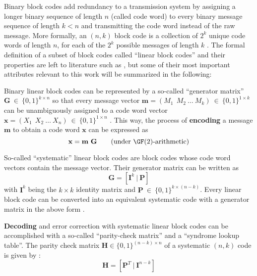 Binary block codes add redundancy to a transmission system by assigning a longer binary sequence of length $n$ (called code word) to every binary message sequence of length $k < n$ and transmitting the code word instead of the raw message.
More formally, an $(n, k)$ block code is a collection of $2^k$ unique code words of length $n$, for each of the $2^k$ possible messages of length $k$ \cite[Section 13.2]{commsys}.
The formal definition of a subset of block codes called ``linear block codes'' and their properties are left to literature such as \cite[Section 13.2]{carlson_commsys}, but some of their most important attributes relevant to this work will be summarized in the following:

Binary linear block codes can be represented by a so-called ``generator matrix'' $\mathbf G ~ \in ~ \{ 0, 1 \}^{k \times n}$ so that every message vector $\mathbf m = (M_1 ~~ M_2 ~ \dots ~ M_k) ~ \in ~ \{ 0, 1 \}^{1 \times k}$ can be unambiguously assigned to a code word vector $\mathbf x = (X_1 ~~ X_2 ~ \dots ~ X_n) ~ \in ~ \{ 0, 1 \}^{1 \times n}$ \cite[Section 13.2]{carlson_commsys}.
This way, the process of \textbf{encoding} a message $\mathbf m$ to obtain a code word $\mathbf x$ can be expressed as
\begin{equation}
	\mathbf x = \mathbf m ~ \mathbf G \qquad \text{(under $\GF(2)$-arithmetic)}
	\label{eq:downlink_generator_encoding}
\end{equation}

So-called ``systematic'' linear block codes are block codes whose code word vectors contain the message vector.
Their generator matrix can be written as
\begin{equation}
	\mathbf G = \left[ \mathbf I^k ~ | ~ \mathbf P \right]
\end{equation}
with $\mathbf I^k$ being the $k \times k$ identity matrix and $\mathbf P ~ \in ~ \{ 0, 1 \} ^ {k \times (n - k)}$.
Every linear block code can be converted into an equivalent systematic code with a generator matrix in the above form \cite[Section 3.4]{ecctechniques}.

\textbf{Decoding} and error correction with systematic linear block codes can be accomplished with a so-called ``parity-check matrix'' and a ``syndrome lookup table''.
The parity check matrix $\mathbf H \in \{ 0, 1 \}^{(n - k) \times n}$ of a systematic $(n, k)$ code is given by \cite[Equation (13.2.14)]{commsys}:
\begin{equation}
	\mathbf H = \left[ \mathbf P^T ~ | ~ \mathbf I^{n - k} \right]
\end{equation}

